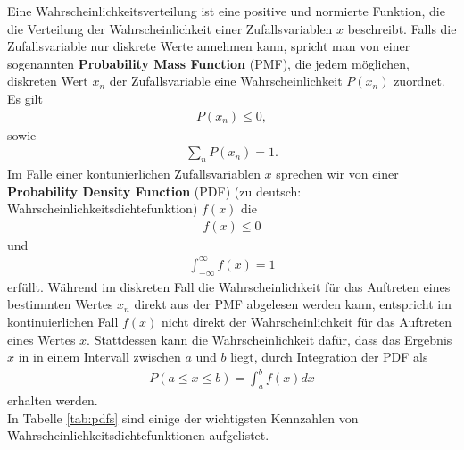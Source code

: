 Eine Wahrscheinlichkeitsverteilung ist eine positive und normierte Funktion, die die Verteilung der Wahrscheinlichkeit einer Zufallsvariablen $x$ beschreibt.  Falls die Zufallsvariable nur diskrete Werte annehmen kann, spricht man von einer sogenannten  \textbf{Probability Mass Function} (PMF), die jedem möglichen, diskreten Wert $x_n$ der Zufallsvariable eine Wahrscheinlichkeit $P(x_n)$ zuordnet. Es gilt 
\begin{align}
P(x_n) \leq 0,
\end{align}
sowie
\begin{align}
\sum_n P(x_n) = 1.
\end{align}
Im Falle einer kontunierlichen Zufallsvariablen $x$ sprechen wir von einer  \textbf{Probability Density Function} (PDF) (zu deutsch: Wahrscheinlichkeitsdichtefunktion) $f(x)$ die
\begin{align}
f(x) \leq 0
\end{align}
und
\begin{align}
\int_{-\infty}^{\infty} f(x) = 1
\end{align}
erfüllt. Während im diskreten Fall die Wahrscheinlichkeit für das Auftreten eines bestimmten Wertes $x_n$ direkt aus der PMF abgelesen werden kann, entspricht im kontinuierlichen Fall $f(x)$ nicht direkt der Wahrscheinlichkeit für das Auftreten eines Wertes $x$. Stattdessen kann die Wahrscheinlichkeit dafür, dass das Ergebnis $x$ in in einem Intervall zwischen $a$ und $b$ liegt, durch Integration der PDF als  
\begin{align}
P(a\leq x \leq b) = \int_a^bf(x)dx
\end{align}
erhalten werden. \\

In Tabelle \ref{tab:pdfs} sind einige der wichtigsten Kennzahlen von Wahrscheinlichkeitsdichtefunktionen aufgelistet.

